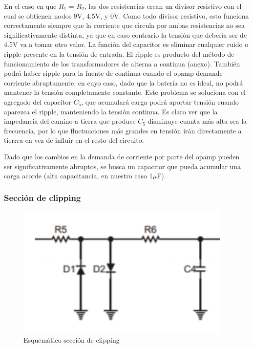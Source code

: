 \documentclass[../../main.tex]{subfiles}
\begin{document}
En el caso en que $R_1$ = $R_2$, las dos resistencias crean un divisor resistivo con el cual se obtienen nodos 9V, 4.5V, y 0V. Como todo divisor resistivo, esto funciona correctamente siempre que la corriente que circula por ambas resistencias no sea significativamente distinta, ya que en caso contrario la tensión que debería ser de 4.5V va a tomar otro valor. 
La función del capacitor es eliminar cualquier ruido o ripple presente en la tensi\'on de entrada. El ripple es producto del m\'etodo de funcionamiento de los transformadores de alterna a continua (anexo). Tambi\'en podr\'a haber ripple para la fuente de continua cuando el opamp demande corriente abruptamente, en cuyo caso, dado que la batería no es ideal, no podrá mantener la tensión completamente constante. Este problema se soluciona con el agregado del capacitor $C_5$, que acumulará carga podrá aportar tensión cuando aparezca el ripple, manteniendo la tensión continua. Es claro ver que la impedancia del camino a tierra que produce $C_5$ disminuye cuanta más alta sea la frecuencia, por lo que fluctuaciones más grandes en tensión irán directamente a tierrra en vez de influir en el resto del circuito.\par
Dado que los cambios en la demanda de corriente por parte del opamp pueden ser significativamente abruptos, se busca un capacitor que pueda acumular una carga acorde (alta capacitancia, en nuestro caso 1$\mu$F). 

\subsubsection{Secci\'on de clipping}

\begin{figure}[H]	%
	\centering
	\includegraphics[scale=1]{imagenes/esquematico_clipping.png}
	\caption{Esquem\'atico secci\'on de clipping}
	\label{fig:ej5_esquematico_clipping}
\end{figure}
\end{document}

